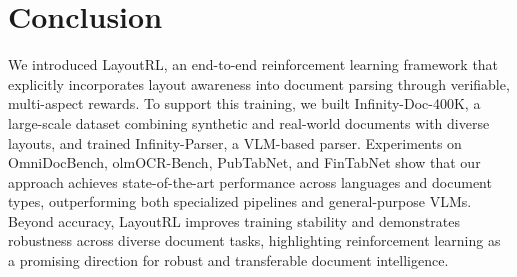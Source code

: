 



\section{Conclusion}


We introduced LayoutRL, an end-to-end reinforcement learning framework that explicitly incorporates layout awareness into document parsing through verifiable, multi-aspect rewards. To support this training, we built Infinity-Doc-400K, a large-scale dataset combining synthetic and real-world documents with diverse layouts, and trained Infinity-Parser, a VLM-based parser. Experiments on OmniDocBench, olmOCR-Bench, PubTabNet, and FinTabNet show that our approach achieves state-of-the-art performance across languages and document types, outperforming both specialized pipelines and general-purpose VLMs. Beyond accuracy, LayoutRL improves training stability and demonstrates robustness across diverse document tasks, highlighting reinforcement learning as a promising direction for robust and transferable document intelligence.